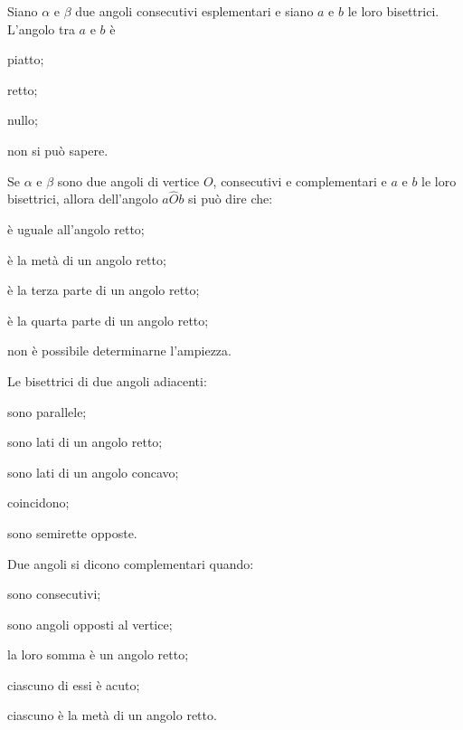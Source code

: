 \begin{esercizio}
\label{ese:1.67}
Siano \(\alpha\) e \(\beta\) due angoli consecutivi esplementari e siano 
\(a\) e \(b\) le loro bisettrici. L'angolo tra \(a\) e \(b\) è
\begin{multicols}{2}
\begin{enumeratea}
\item piatto;
\item retto;
\item nullo;
\item non si può sapere.
\end{enumeratea}
\end{multicols}
\end{esercizio}

\begin{esercizio}
\label{ese:1.68}
Se \(\alpha\) e \(\beta\) sono due angoli di vertice \(O\), consecutivi e 
complementari e \(a\) e \(b\) le loro bisettrici, allora dell'angolo 
\(a\widehat{O}b\) si può dire  che:
\begin{multicols}{2}
\begin{enumeratea}
\item è uguale all'angolo retto;
\item è la metà di un angolo retto;
\item è la terza parte di un angolo retto;
\item è la quarta parte di un angolo retto;
\item non è possibile determinarne l'ampiezza.
\end{enumeratea}
\end{multicols}
\end{esercizio}

\begin{esercizio}
\label{ese:1.69}
Le bisettrici di due angoli adiacenti:
\begin{multicols}{2}
\begin{enumeratea}
\item sono parallele;
\item sono lati di un angolo retto;
\item sono lati di un angolo concavo;
\item coincidono;
\item sono semirette opposte.
\end{enumeratea}
\end{multicols}
\end{esercizio}

\begin{esercizio}
\label{ese:1.70}
Due angoli si dicono complementari quando:
\begin{multicols}{2}
\begin{enumeratea}
\item sono consecutivi;
\item sono angoli opposti al vertice;
\item la loro somma è un angolo retto;
\item ciascuno di essi è acuto;
\item ciascuno è la metà di un angolo retto.
\end{enumeratea}
\end{multicols}
\end{esercizio}

